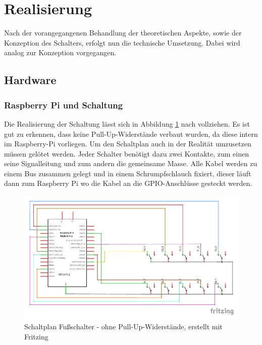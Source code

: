 \section{Realisierung}
Nach der vorangegangenen Behandlung der theoretischen Aspekte, sowie der Konzeption des Schalters, erfolgt nun die technische Umsetzung. Dabei wird analog zur Konzeption vorgegangen. 
\subsection{Hardware}
\subsubsection{Raspberry Pi und Schaltung}
Die Realisierung der Schaltung lässt sich in Abbildung \ref{konzeption:schaltplan} nach vollziehen. Es ist gut zu erkennen, dass keine Pull-Up-Widerstände verbaut wurden, da diese intern im Raspberry-Pi vorliegen. Um den Schaltplan auch in der Realität umzusetzen müssen gelötet werden. Jeder Schalter benötigt dazu zwei Kontakte, zum einen seine Signalleitung und zum andern die gemeinsame Masse. Alle Kabel werden zu einem Bus zusammen gelegt und in einem Schrumpfschlauch fixiert, dieser läuft dann zum Raspberry Pi wo die Kabel an die GPIO-Anschlüsse gesteckt werden.   
\begin{figure}[h!tbp]
	\centering
	\includegraphics[trim={0.4cm 1cm  0.4cm 0.3cm},clip,width=\textwidth]{bilder/raspi_schaltplan}
	\caption{Schaltplan Fußschalter - ohne Pull-Up-Widerstände, erstellt mit Fritzing }
	\label{konzeption:schaltplan}
\end{figure}	

